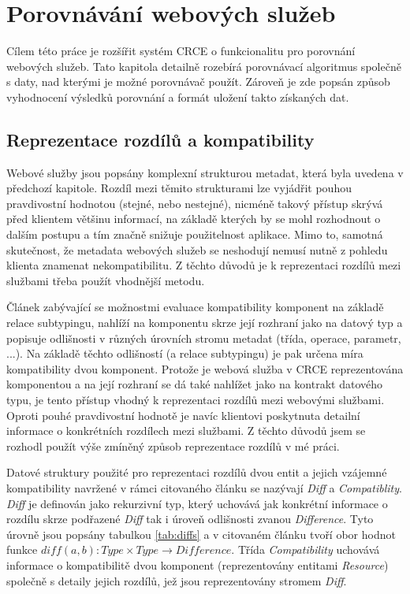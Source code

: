 \documentclass[czech,DP]{thesiskiv}
\begin{document}
\chapter{Porovnávání webových služeb}

Cílem této práce je rozšířit systém CRCE o funkcionalitu pro porovnání webových služeb. Tato kapitola detailně rozebírá porovnávací algoritmus společně s daty, nad kterými je možné porovnávač použít. Zároveň je zde popsán způsob vyhodnocení výsledků porovnání a formát uložení takto získaných dat.

\section{Reprezentace rozdílů a kompatibility}
\label{sec:diff-info}
Webové služby jsou popsány komplexní strukturou metadat, která byla uvedena v předchozí kapitole. Rozdíl mezi těmito strukturami lze vyjádřit pouhou pravdivostní hodnotou (stejné, nebo nestejné), nicméně takový přístup skrývá před klientem většinu informací, na základě kterých by se mohl rozhodnout o dalším postupu a tím značně snižuje použitelnost aplikace. Mimo to, samotná skutečnost, že metadata webových služeb se neshodují nemusí nutně z pohledu klienta znamenat nekompatibilitu. Z těchto důvodů je k reprezentaci rozdílů mezi službami třeba použít vhodnější metodu.

Článek \cite{brada2006diff} zabývající se možnostmi evaluace kompatibility komponent na základě relace subtypingu, nahlíží na komponentu skrze její rozhraní jako na datový typ a popisuje odlišnosti v různých úrovních stromu metadat (třída, operace, parametr, ...). Na základě těchto odlišností (a relace subtypingu) je pak určena míra kompatibility dvou komponent. Protože je webová služba v CRCE reprezentována komponentou a na její rozhraní se dá také nahlížet jako na kontrakt datového typu, je tento přístup vhodný k reprezentaci rozdílů mezi webovými službami. Oproti pouhé pravdivostní hodnotě je navíc klientovi poskytnuta detailní informace o konkrétních rozdílech mezi službami. Z těchto důvodů jsem se rozhodl použít výše zmíněný způsob reprezentace rozdílů v mé práci. 

Datové struktury použité pro reprezentaci rozdílů dvou entit a jejich vzájemné kompatibility navržené v rámci citovaného článku se nazývají \textit{Diff} a \textit{Compatiblity}. \textit{Diff} je definován jako rekurzivní typ, který uchovává jak konkrétní informace o rozdílu skrze podřazené \textit{Diff} tak i úroveň odlišnosti zvanou \textit{Difference}. Tyto úrovně jsou popsány tabulkou \ref{tab:diffs} a v citovaném článku tvoří obor hodnot funkce $diff(a,b): Type \times Type \rightarrow Difference$. Třída \textit{Compatibility} uchovává informace o kompatibilitě dvou komponent (reprezentovány entitami \textit{Resource}) společně s detaily jejich rozdílů, jež jsou reprezentovány stromem \textit{Diff}.
\end{document}
